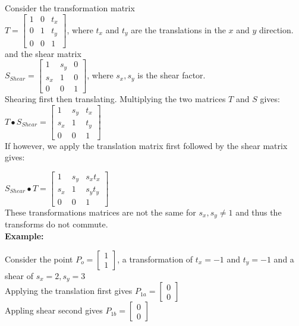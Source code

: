 \documentclass[a4paper,10pt]{scrartcl}
\begin{document}
Consider the transformation matrix \\

$T = 
\begin{bmatrix}
    1       & 0 & t_x \\
    0       & 1 & t_y \\
    0       & 0 & 1 
\end{bmatrix}
$, where $t_x $ and $t_y$ are the translations in the $x$ and $y$ direction. \\

and the shear matrix \\

$S_{Shear} = \begin{bmatrix}
    1       & s_y & 0 \\
    s_x       & 1 & 0 \\
    0       & 0 & 1     
 \end{bmatrix}
$, where $s_x, s_y$ is the shear factor. \\

Shearing first then translating. Multiplying the two matrices $T$ and $S$ gives: \\

$T \bullet S_{Shear} = \begin{bmatrix}
		  1 & s_y & t_x \\
		  s_x & 1 & t_y \\
		  0 & 0 & 1
               \end{bmatrix}
$ \\

If however, we apply the translation matrix first followed by the shear matrix gives:

$S_{Shear} \bullet T = \begin{bmatrix}
		  1 & s_y & s_xt_x \\
		  s_x & 1 & s_yt_y \\
		  0 & 0 & 1
               \end{bmatrix}
$ \\

These transformations matrices are not the same for $s_x, s_y \neq 1$ and thus the transforms do not commute. \\ 


{\bfseries{Example:}}

Consider the point $P_o = \begin{bmatrix} 1 \\ 1 \end{bmatrix}$, a transformation of $t_x = -1$ and $t_y = -1$ and a shear of $s_x = 2, s_y = 3$\\
Applying the translation first gives $P_{1a} = \begin{bmatrix} 0 \\ 0 \end{bmatrix}$ \\ 
Appling shear second gives $P_{1b} = \begin{bmatrix} 0 \\ 0 \end{bmatrix}$
\end{document}
